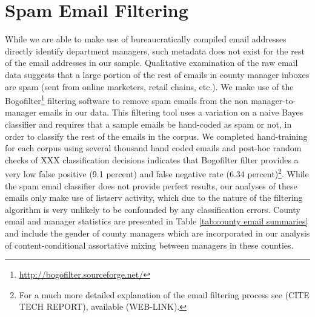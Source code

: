 \documentclass[fleqn]{MJDArticle}
\begin{document}
\section{Spam Email Filtering}

While we are able to make use of bureaucratically compiled email addresses directly identify department managers, such metadata does not exist for the rest of the email addresses in our sample. Qualitative examination of the raw email data suggests that a large portion of the rest of emails in county manager inboxes are spam (sent from online marketers, retail chains, etc.). We make use of the Bogofilter\footnote{\href{http://bogofilter.sourceforge.net/}{http://bogofilter.sourceforge.net/}} filtering software to remove spam emails from the non manager-to-manager emails in our data. This filtering tool uses a variation on a naive Bayes classifier and requires that a sample emails be hand-coded as spam or not, in order to classify the rest of the emails in the corpus. We completed hand-training for each corpus using several thousand hand coded emails and post-hoc random checks of XXX classification decisions indicates that Bogofilter filter provides a very low false positive (9.1 percent) and  false negative rate (6.34 percent)\footnote{For a much more detailed explanation of the email filtering process see (CITE TECH REPORT), available (WEB-LINK).}. While the spam email classifier does not provide perfect results, our analyses of these emails only make use of listserv activity, which due to the nature of the filtering algorithm is very unlikely to be confounded by any classification errors. County email and manager statistics are presented in Table \ref{tab:county email summaries} and include the gender of county managers which are incorporated in our analysis of content-conditional assortative mixing between managers in these counties.  
\end{document}
